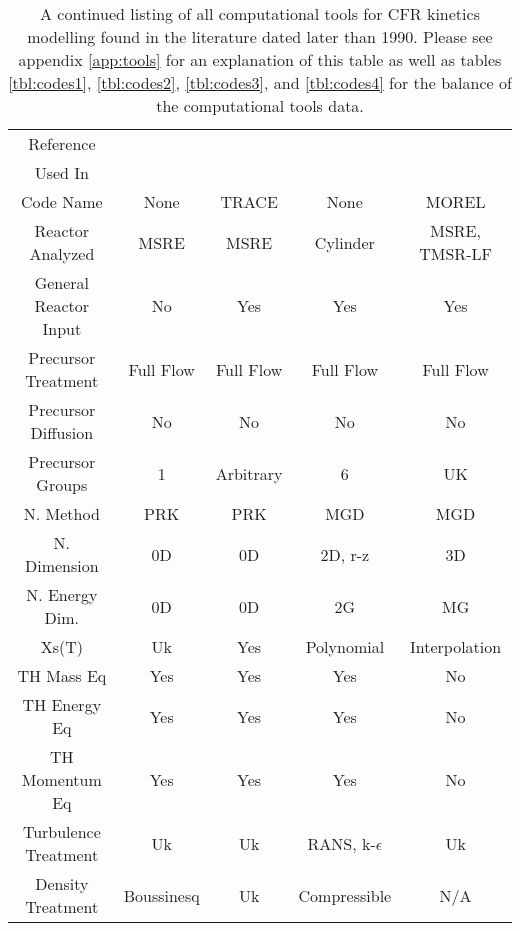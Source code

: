 \documentclass[review]{elsarticle}
\begin{document}
\begin{appendices}
\begin{landscape}
\begin{table}[H]
    \caption{A continued listing of all computational tools for CFR kinetics modelling
        found in the literature dated later than 1990. Please see appendix
        \ref{app:tools} for an explanation of this table as well as tables
        \ref{tbl:codes1}, \ref{tbl:codes2}, \ref{tbl:codes3}, and
        \ref{tbl:codes4} for the balance of the computational tools data.}
    \label{tbl:codes5}
    \begin{center}
        \begin{tabular}{|c c c c c|}
            \hline
            Reference &
                \cite{zanetti_development_2016} &
                \cite{zanetti_extension_2015} &
                \cite{zhang_development_2009-1} &
                \cite{zhuang_studies_2015} \\
                Used In & & & \cite{zhang_analysis_2009} &
                    \cite{zheng_development_2014} \\
                Code Name & None & TRACE & None & MOREL\\
                Reactor Analyzed & MSRE & MSRE & Cylinder & MSRE, TMSR-LF\\
                General Reactor Input & No & Yes & Yes & Yes \\
                Precursor Treatment & Full Flow & Full Flow & Full Flow &
                    Full Flow \\
                Precursor Diffusion & No & No & No & No \\
                Precursor Groups & 1 & Arbitrary & 6 & UK \\
                N. Method & PRK & PRK & MGD & MGD\\
                N. Dimension & 0D & 0D & 2D, r-z & 3D\\
                N. Energy Dim. & 0D & 0D & 2G & MG\\
                Xs(T) & Uk & Yes & Polynomial & Interpolation\\
                TH Mass Eq & Yes & Yes & Yes & No\\
                TH Energy Eq & Yes & Yes & Yes & No\\
                TH Momentum Eq & Yes & Yes & Yes & No\\
                Turbulence Treatment & Uk & Uk & RANS, k-$\epsilon$ & Uk\\
                Density Treatment & Boussinesq & Uk & Compressible & N/A\\

\end{tabular}
\end{center}
\end{table}
\end{landscape}
\end{appendices}
\end{document}
